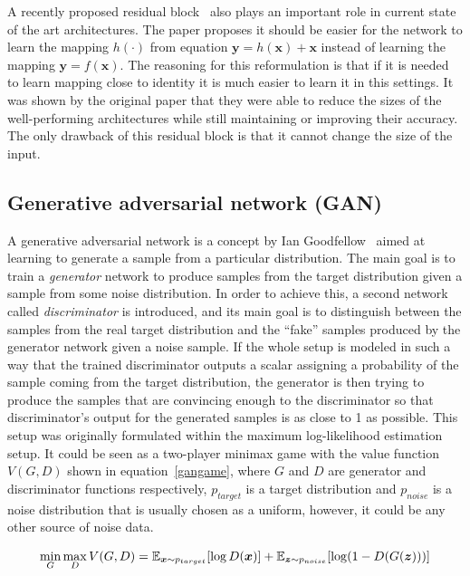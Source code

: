 A recently proposed residual block~\cite{resnet} also plays an important role in current state of the art architectures. The paper proposes it should be easier for the network to learn the mapping $h(\cdot)$ from equation $\bm{y} = h(\bm{x}) + \bm{x}$ instead of learning the mapping $\bm{y} = f(\bm{x})$. The reasoning for this reformulation is that if it is needed to learn mapping close to identity it is much easier to learn it in this settings. It was shown by the original paper that they were able to reduce the sizes of the well-performing architectures while still maintaining or improving their accuracy. The only drawback of this residual block is that it cannot change the size of the input.

\subsection{Generative adversarial network (GAN)}

A generative adversarial network is a concept by Ian Goodfellow~\cite{origgan} aimed at learning to generate a sample from a particular distribution. The main goal is to train a {\em generator} network to produce samples from the target distribution given a sample from some noise distribution. In order to achieve this, a second network called {\em discriminator} is introduced, and its main goal is to distinguish between the samples from the real target distribution and the ``fake'' samples produced by the generator network given a noise sample. If the whole setup is modeled in such a way that the trained discriminator outputs a scalar assigning a probability of the sample coming from the target distribution, the generator is then trying to produce the samples that are convincing enough to the discriminator so that discriminator's output for the generated samples is as close to 1 as possible. This setup was originally formulated within the maximum log-likelihood estimation setup. It could be seen as a two-player minimax game with the value function $V(G, D)$ shown in equation~\ref{gangame}, where $G$ and $D$ are generator and discriminator functions respectively, $p_{target}$ is a target distribution and $p_{noise}$ is a noise distribution that is usually chosen as a uniform, however, it could be any other source of noise data.

\begin{equation}
\min_G \max_D V(G, D) = \operatorname{\mathbb{E}}_{\bm{x}\sim p_{target}}[\log D(\bm{x})] + \operatorname{\mathbb{E}}_{\bm{z}\sim p_{noise}} [\log(1 - D(G(\bm{z})))]
\label{gangame}
\end{equation}

